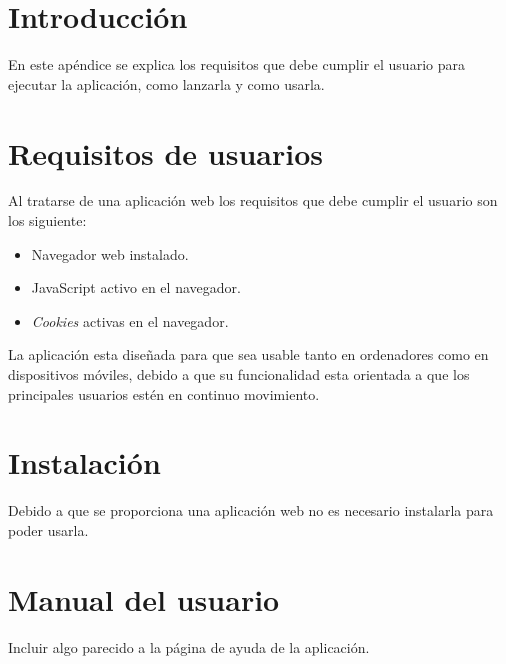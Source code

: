 
\section{Introducción}
En este apéndice se explica los requisitos que debe cumplir el usuario para ejecutar la aplicación, como lanzarla y como usarla.

\section{Requisitos de usuarios}
Al tratarse de una aplicación web los requisitos que debe cumplir el usuario son los siguiente:
\begin{itemize}
	\item Navegador web instalado.
	\item JavaScript activo en el navegador.
	\item \textit{Cookies} activas en el navegador.
\end{itemize}

La aplicación esta diseñada para que sea usable tanto en ordenadores como en dispositivos móviles, debido a que su funcionalidad esta orientada a que los principales usuarios estén en continuo movimiento.

\section{Instalación}
Debido a que se proporciona una aplicación web no es necesario instalarla para poder usarla.

\section{Manual del usuario}
Incluir algo parecido a la página de ayuda de la aplicación.


